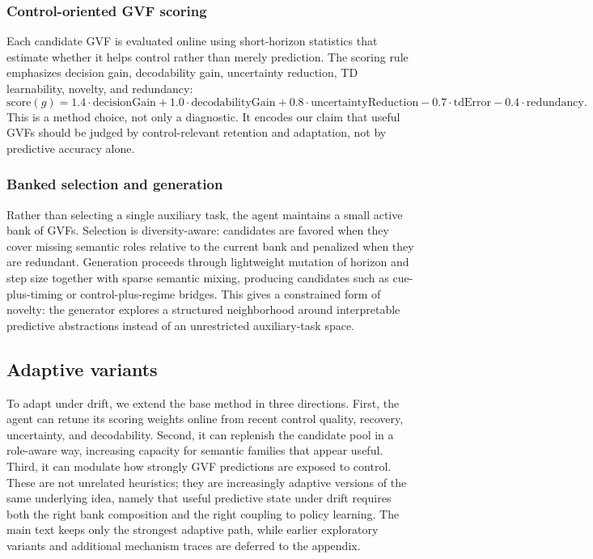 \documentclass[11pt]{article}
\begin{document}
\subsubsection{Control-oriented GVF scoring}
Each candidate GVF is evaluated online using short-horizon statistics that estimate whether it helps control rather than merely prediction. The scoring rule emphasizes decision gain, decodability gain, uncertainty reduction, TD learnability, novelty, and redundancy:
\begin{equation}
\mathrm{score}(g) =
1.4 \cdot \mathrm{decisionGain}
+ 1.0 \cdot \mathrm{decodabilityGain}
+ 0.8 \cdot \mathrm{uncertaintyReduction}
- 0.7 \cdot \mathrm{tdError}
- 0.4 \cdot \mathrm{redundancy}.
\end{equation}
This is a method choice, not only a diagnostic. It encodes our claim that useful GVFs should be judged by control-relevant retention and adaptation, not by predictive accuracy alone.

\subsubsection{Banked selection and generation}
Rather than selecting a single auxiliary task, the agent maintains a small active bank of GVFs. Selection is diversity-aware: candidates are favored when they cover missing semantic roles relative to the current bank and penalized when they are redundant. Generation proceeds through lightweight mutation of horizon and step size together with sparse semantic mixing, producing candidates such as cue-plus-timing or control-plus-regime bridges. This gives a constrained form of novelty: the generator explores a structured neighborhood around interpretable predictive abstractions instead of an unrestricted auxiliary-task space.

\subsection{Adaptive variants}
To adapt under drift, we extend the base method in three directions. First, the agent can retune its scoring weights online from recent control quality, recovery, uncertainty, and decodability. Second, it can replenish the candidate pool in a role-aware way, increasing capacity for semantic families that appear useful. Third, it can modulate how strongly GVF predictions are exposed to control. These are not unrelated heuristics; they are increasingly adaptive versions of the same underlying idea, namely that useful predictive state under drift requires both the right bank composition and the right coupling to policy learning. The main text keeps only the strongest adaptive path, while earlier exploratory variants and additional mechanism traces are deferred to the appendix.
\end{document}
